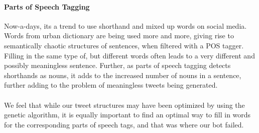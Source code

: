 \paragraph{Parts of Speech Tagging}
Now-a-days, its a trend to use shorthand and mixed up words on social media. Words from urban dictionary are being used more and more, giving rise to semantically chaotic structures of sentences, when filtered with a POS tagger. Filling in the same type of, but different words often leads to a very different and possibly meaningless sentence. Further, as parts of speech tagging detects shorthands as nouns, it adds to the increased number of nouns in a sentence, further adding to the problem of meaningless tweets being generated.

\paragraph{}
We feel that while our tweet structures may have been optimized by using the genetic algorithm, it is equally important to find an optimal way to fill in words for the corresponding parts of speech tags, and that was where our bot failed.